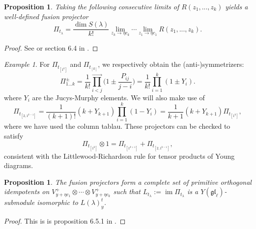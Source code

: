 \documentclass[11pt]{report}
\newtheorem{prop}[theorem]{Proposition}
\theoremstyle{definition}
\theoremstyle{remark}
\theoremstyle{remark}
\newtheorem*{example}{Example}
\begin{document}
\begin{prop}\label{prop:fusionDecomposition}
Taking the following consecutive limits of $R(z_1,...,z_k)$ yields a well-defined \emph{fusion projector}
\begin{equation*}
\Pi_{t_\lambda} = \frac{\dim S(\lambda)}{k!} \lim_{z_k \to \eta c_k} \cdots \lim_{z_1 \to \eta c_1} R(z_1,...,z_k).
\end{equation*}
\end{prop}

\begin{proof}
See \cite{article:molev:2008} or section 6.4 in \cite{book:molev}.
\end{proof}

\begin{example}
For $\Pi_{t_{[1^k]}}$ and $\Pi_{t_{[k]}}$, we respectively obtain the (anti-)symmetrizers:
\begin{equation*}
\Pi_{1...k}^\pm = \frac{1}{k!} \overset{\longrightarrow}{\prod_{i < j}} \bigg( 1 \pm \frac{P_{ij}}{j-i} \bigg) = \frac{1}{k!} \prod_{i=1}^k (1 \pm Y_i).
\end{equation*}
where $Y_i$ are the Jucys-Murphy elements. We will also make use of
\begin{equation}\label{equation:hookProjector}
\Pi_{t_{[2,1^{k-1}]}} = \frac{1}{(k+1)!} (k+Y_{k+1}) \prod_{i=1}^k (1-Y_i) = \frac{1}{k+1} (k + Y_{k+1}) \Pi_{t_{[1^k]}},
\end{equation}
where we have used the column tablau. These projectors can be checked to satisfy
\begin{equation}\label{equation:LRRule}
\Pi_{t_{[1^k]}} \otimes 1 = \Pi_{t_{[1^{k+1}]}} + \Pi_{t_{[2,1^{k-1}]}},
\end{equation}
consistent with the Littlewood-Richardson rule for tensor products of Young diagrams.
\end{example}

\begin{prop}
The fusion projectors form a complete set of primitive orthogonal idempotents on $V_{y+\eta c_1}^+ \otimes \cdots \otimes V_{y+\eta c_k}^+$ such that $L_{t_\lambda} := \operatorname{im} \Pi_{t_\lambda}$ is a $Y(\mathfrak{gl}_\ell)$-submodule isomorphic to $L(\lambda)_y^t$.
\end{prop}

\begin{proof}
This is is proposition 6.5.1 in \cite{book:molev}.
\end{proof}
\end{document}
